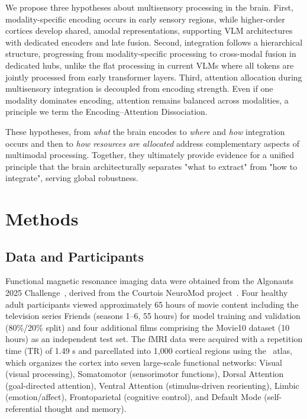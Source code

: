 \documentclass[10pt,letterpaper]{article}
\begin{document}
We propose three hypotheses about multisensory processing in the brain. First, modality-specific encoding occurs in early sensory regions, while higher-order cortices develop shared, amodal representations, supporting VLM architectures with dedicated encoders and late fusion. Second, integration follows a hierarchical structure, progressing from modality-specific processing to cross-modal fusion in dedicated hubs, unlike the flat processing in current VLMs where all tokens are jointly processed from early transformer layers. Third, attention allocation during multisensory integration is decoupled from encoding strength. Even if one modality dominates encoding, attention remains balanced across modalities, a principle we term the Encoding–Attention Dissociation.

These hypotheses, from \textit{what} the brain encodes to \textit{where} and \textit{how} integration occurs and then to \textit{how resources are allocated} address complementary aspects of multimodal processing. Together, they ultimately provide evidence for a unified principle that the brain architecturally separates "what to extract" from "how to integrate", serving global robustness.

\section{Methods}

\subsection{Data and Participants}

Functional magnetic resonance imaging data were obtained from the Algonauts 2025 Challenge~\citep{gifford2024algonauts}, derived from the Courtois NeuroMod project~\citep{boyle2023courtois}. Four healthy adult participants viewed approximately 65 hours of movie content including the television series Friends (seasons 1–6, 55 hours) for model training and validation (80\%/20\% split) and four additional films comprising the Movie10 dataset (10 hours) as an independent test set. The fMRI data were acquired with a repetition time (TR) of 1.49 s and parcellated into 1,000 cortical regions using the~\citet{schaefer2018local} atlas, which organizes the cortex into seven large-scale functional networks: Visual (visual processing), Somatomotor (sensorimotor functions), Dorsal Attention (goal-directed attention), Ventral Attention (stimulus-driven reorienting), Limbic (emotion/affect), Frontoparietal (cognitive control), and Default Mode (self-referential thought and memory).
\end{document}
